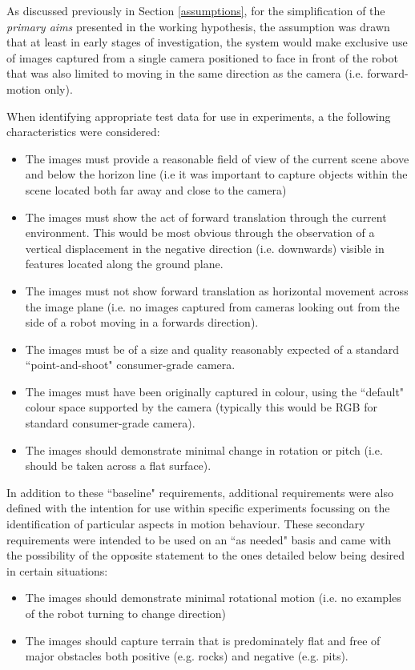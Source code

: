 As discussed previously in Section \ref{assumptions}, for the simplification of the \textit{primary aims} presented in the working hypothesis, the assumption was drawn that at least in early stages of investigation, the system would make exclusive use of images captured from a single camera positioned to face in front of the robot that was also limited to moving in the same direction as the camera (i.e. forward-motion only).

When identifying appropriate test data for use in experiments, a the following characteristics were considered:

\begin{itemize}
	\item The images must provide a reasonable field of view of the current scene above and below the horizon line (i.e it was important to capture objects within the scene located both far away and close to the camera)
	\item The images must show the act of forward translation through the current environment. This would be most obvious through the observation of a vertical displacement in the negative direction (i.e. downwards) visible in features located along the ground plane.
	\item The images must not show forward translation as horizontal movement across the image plane (i.e. no images captured from cameras looking out from the side of a robot moving in a forwards direction).
	\item The images must be of a size and quality reasonably expected of a standard ``point-and-shoot" consumer-grade camera.
	\item The images must have been originally captured in colour, using the ``default" colour space supported by the camera (typically this would be RGB for standard consumer-grade camera).
	 \item The images should demonstrate minimal change in rotation or pitch (i.e. should be taken across a flat surface).
\end{itemize}

In addition to these ``baseline" requirements, additional requirements were also defined with the intention for use within specific experiments focussing on the identification of particular aspects in motion behaviour. These secondary requirements were intended to be used on an ``as needed" basis and came with the possibility of the opposite statement to the ones detailed below being desired in certain situations:

\begin{itemize}
	\item The images should demonstrate minimal rotational motion (i.e. no examples of the robot turning to change direction)
	\item The images should capture terrain that is predominately flat and free of major obstacles both positive (e.g. rocks) and negative (e.g. pits).
\end{itemize}

